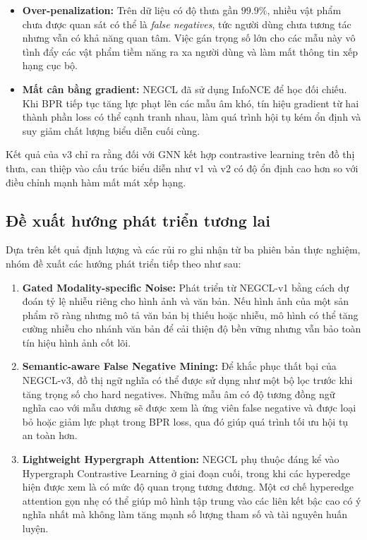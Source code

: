 \begin{itemize}[leftmargin=*,labelsep=6pt]
    \item \textbf{Over-penalization:} Trên dữ liệu có độ thưa gần $99.9\%$, nhiều vật phẩm chưa được quan sát có thể là \textit{false negatives}, tức người dùng chưa tương tác nhưng vẫn có khả năng quan tâm. Việc gán trọng số lớn cho các mẫu này vô tình đẩy các vật phẩm tiềm năng ra xa người dùng và làm mất thông tin xếp hạng cục bộ.
    \item \textbf{Mất cân bằng gradient:} NEGCL đã sử dụng InfoNCE để học đối chiếu. Khi BPR tiếp tục tăng lực phạt lên các mẫu âm khó, tín hiệu gradient từ hai thành phần loss có thể cạnh tranh nhau, làm quá trình hội tụ kém ổn định và suy giảm chất lượng biểu diễn cuối cùng.
\end{itemize}

Kết quả của v3 chỉ ra rằng đối với GNN kết hợp contrastive learning trên đồ thị thưa, can thiệp vào cấu trúc biểu diễn như v1 và v2 có độ ổn định cao hơn so với điều chỉnh mạnh hàm mất mát xếp hạng.

\subsection{Đề xuất hướng phát triển tương lai}

Dựa trên kết quả định lượng và các rủi ro ghi nhận từ ba phiên bản thực nghiệm, nhóm đề xuất các hướng phát triển tiếp theo như sau:

\begin{enumerate}[leftmargin=*,label=\textbf{Hướng \arabic*.}]
    \item \textbf{Gated Modality-specific Noise:}
    Phát triển từ NEGCL-v1 bằng cách dự đoán tỷ lệ nhiễu riêng cho hình ảnh và văn bản. Nếu hình ảnh của một sản phẩm rõ ràng nhưng mô tả văn bản bị thiếu hoặc nhiễu, mô hình có thể tăng cường nhiễu cho nhánh văn bản để cải thiện độ bền vững nhưng vẫn bảo toàn tín hiệu hình ảnh cốt lõi.

    \item \textbf{Semantic-aware False Negative Mining:}
    Để khắc phục thất bại của NEGCL-v3, đồ thị ngữ nghĩa có thể được sử dụng như một bộ lọc trước khi tăng trọng số cho hard negatives. Những mẫu âm có độ tương đồng ngữ nghĩa cao với mẫu dương sẽ được xem là ứng viên false negative và được loại bỏ hoặc giảm lực phạt trong BPR loss, qua đó giúp quá trình tối ưu hội tụ an toàn hơn.

    \item \textbf{Lightweight Hypergraph Attention:}
    NEGCL phụ thuộc đáng kể vào Hypergraph Contrastive Learning ở giai đoạn cuối, trong khi các hyperedge hiện được xem là có mức độ quan trọng tương đương. Một cơ chế hyperedge attention gọn nhẹ có thể giúp mô hình tập trung vào các liên kết bậc cao có ý nghĩa nhất mà không làm tăng mạnh số lượng tham số và tài nguyên huấn luyện.
\end{enumerate}

\clearpage